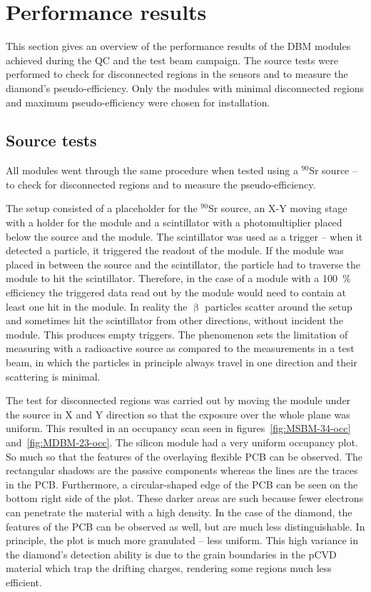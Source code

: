 \section{Performance results}
\label{sec:perfresults}
This section gives an overview of the performance results of the DBM modules achieved during the QC and the test beam campaign. The source tests were performed to check for disconnected regions in the sensors and to measure the diamond's pseudo-efficiency. Only the modules with minimal disconnected regions and maximum pseudo-efficiency were chosen for installation. 

\subsection{Source tests}
All modules went through the same procedure when tested using a $^{90}$Sr source -- to check for disconnected regions and to measure the pseudo-efficiency. 

The setup consisted of a placeholder for the $^{90}$Sr source, an X-Y moving stage with a holder for the module and a scintillator with a photomultiplier placed below the source and the module. The scintillator was used as a trigger -- when it detected a particle, it triggered the readout of the module. If the module was placed in between the source and the scintillator, the particle had to traverse the module to hit the scintillator. Therefore, in the case of a module with a 100~\% efficiency the triggered data read out by the module would need to contain at least one hit in the module. In reality the $\upbeta$ particles scatter around the setup and sometimes hit the scintillator from other directions, without incident the module. This produces empty triggers. The phenomenon sets the limitation of measuring with a radioactive source as compared to the measurements in a test beam, in which the particles in principle always travel in one direction and their scattering is minimal. 

The test for disconnected regions was carried out by moving the module under the source in X and Y direction so that the exposure over the whole plane was uniform. This resulted in an occupancy scan seen in figures~\ref{fig:MSBM-34-occ} and~\ref{fig:MDBM-23-occ}. The silicon module had a very uniform occupancy plot. So much so that the features of the overlaying flexible PCB can be observed. The rectangular shadows are the passive components whereas the lines are the traces in the PCB. Furthermore, a circular-shaped edge of the PCB can be seen on the bottom right side of the plot. These darker areas are such because fewer electrons can penetrate the material with a high density. In the case of the diamond, the features of the PCB can be observed as well, but are much less distinguishable. In principle, the plot is much more granulated -- less uniform. This high variance in the diamond's detection ability is due to the grain boundaries in the pCVD material which trap the drifting charges, rendering some regions much less efficient. 

